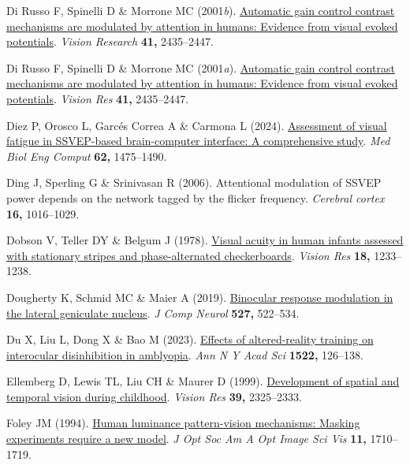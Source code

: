 \documentclass[
  letterpaper,
  DIV=11,
  numbers=noendperiod]{scrartcl}
\newlength{\cslhangindent}
\newenvironment{CSLReferences}[2] %
 {\begin{list}{}{%
  \setlength{\itemindent}{0pt}
  \setlength{\leftmargin}{0pt}
  \setlength{\parsep}{0pt}
  \ifodd #1
   \setlength{\leftmargin}{\cslhangindent}
   \setlength{\itemindent}{-1\cslhangindent}
  \fi
  \setlength{\itemsep}{#2\baselineskip}}}
 {\end{list}}
\begin{document}
\begin{CSLReferences}{1}{1}
Di Russo F, Spinelli D \& Morrone MC (2001\emph{b}).
\href{https://doi.org/10.1016/S0042-6989(01)00134-1}{Automatic gain
control contrast mechanisms are modulated by attention in humans:
Evidence from visual evoked potentials}. \emph{Vision Research}
\textbf{41,} 2435--2447.

Di Russo F, Spinelli D \& Morrone MC (2001\emph{a}).
\href{https://doi.org/10.1016/s0042-6989(01)00134-1}{Automatic gain
control contrast mechanisms are modulated by attention in humans:
Evidence from visual evoked potentials}. \emph{Vision Res} \textbf{41,}
2435--2447.

Diez P, Orosco L, Garcés Correa A \& Carmona L (2024).
\href{https://doi.org/10.1007/s11517-023-03000-z}{Assessment of visual
fatigue in SSVEP-based brain-computer interface: A comprehensive study}.
\emph{Med Biol Eng Comput} \textbf{62,} 1475--1490.

Ding J, Sperling G \& Srinivasan R (2006). Attentional modulation of
{SSVEP} power depends on the network tagged by the flicker frequency.
\emph{Cerebral cortex} \textbf{16,} 1016--1029.

Dobson V, Teller DY \& Belgum J (1978).
\href{https://doi.org/10.1016/0042-6989(78)90109-8}{Visual acuity in
human infants assessed with stationary stripes and phase-alternated
checkerboards}. \emph{Vision Res} \textbf{18,} 1233--1238.

Dougherty K, Schmid MC \& Maier A (2019).
\href{https://doi.org/10.1002/cne.24417}{Binocular response modulation
in the lateral geniculate nucleus}. \emph{J Comp Neurol} \textbf{527,}
522--534.

Du X, Liu L, Dong X \& Bao M (2023).
\href{https://doi.org/10.1111/nyas.14969}{Effects of altered-reality
training on interocular disinhibition in amblyopia}. \emph{Ann N Y Acad
Sci} \textbf{1522,} 126--138.

Ellemberg D, Lewis TL, Liu CH \& Maurer D (1999).
\href{https://doi.org/10.1016/s0042-6989(98)00280-6}{Development of
spatial and temporal vision during childhood}. \emph{Vision Res}
\textbf{39,} 2325--2333.

Foley JM (1994). \href{https://doi.org/10.1364/josaa.11.001710}{Human
luminance pattern-vision mechanisms: Masking experiments require a new
model}. \emph{J Opt Soc Am A Opt Image Sci Vis} \textbf{11,} 1710--1719.


\end{CSLReferences}
\end{document}
